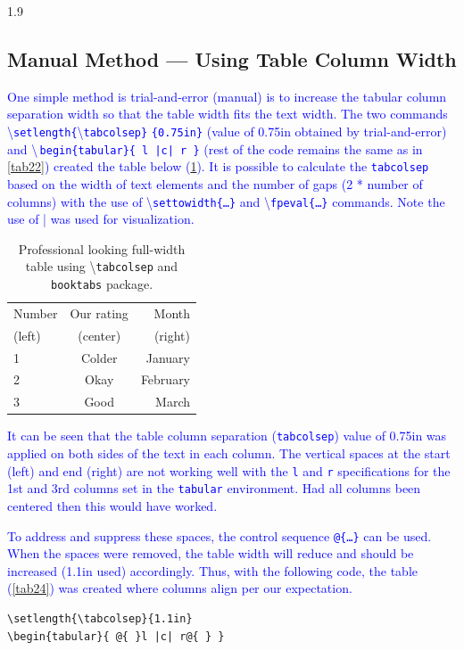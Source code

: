 \documentclass[phd]{ndsu-thesis-2022}
\newcommand\myspacing{1.9}      %
\newcommand\italk[1]{\textcolor{blue}{#1}}  %
\newcommand\cmd[1]{\textbackslash\texttt{#1}}  %
\newcommand\vb[1]{\textcolor{blue}{\texttt{#1}}}%
\newcommand\vbc[1]{\textcolor{blue}{\textbackslash\,\texttt{#1}}}%
\begin{document}
\begin{spacing}{\myspacing}
\subsection{Manual Method --- Using Table Column Width}
\italk{One simple method is trial-and-error (manual) is to increase the tabular column separation width so that the table width fits the text width. The two commands \cmd{setlength\{}\cmd{tabcolsep\}} \vb{\{0.75in\}} (value of 0.75in obtained by trial-and-error) and \vbc{begin\{tabular\}\{ l    |c|    r \}} (rest of the code remains the same as in \cref{tab22}) created the table below (\cref{tab23}). It is possible to calculate the \vb{tabcolsep} based on the width of text elements  and the number of gaps (2 * number of columns) with the use of \cmd{settowidth\{\ldots\}} and \cmd{fpeval\{\ldots\}} commands. Note the use of | was used for visualization.} 

\begin{table}[h!]
\centering
\caption{Professional looking full-width table using \cmd{tabcolsep} and \texttt{booktabs} package.}
\setlength{\tabcolsep}{0.75in}
\begin{tabular}{ l    |c|    r }
\toprule
Number & Our rating & Month \\
(left) & (center)   & (right)\\
\midrule
1 & Colder & January \\
2 & Okay   & February \\
3 & Good   & March\\
\bottomrule
\end{tabular}
\label{tab23}
\end{table}

\italk{It can be seen that the table column separation (\vb{tabcolsep}) value of 0.75in was applied on both sides of the text in each column. The vertical spaces at the start (left) and end (right) are not working well with the \vb{l} and \vb{r} specifications for the 1st and 3rd columns set in the \vb{tabular} environment. Had all columns been centered then this would have worked.}

\italk{To address and suppress these spaces, the control sequence \vb{@\{\ldots\}} can be used. When the spaces were removed, the table width will reduce and should be increased (1.1in used) accordingly. Thus, with the following code, the table (\cref{tab24}) was created where columns align per our expectation.
}

{\singlespacing
\begin{verbatim}
\setlength{\tabcolsep}{1.1in}
\begin{tabular}{ @{ }l |c| r@{ } }
\end{verbatim}
}


\end{spacing}
\end{document}
